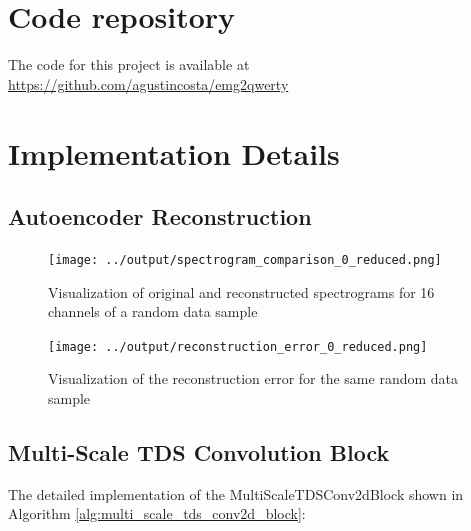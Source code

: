 \section{Code repository}
The code for this project is available at \url{https://github.com/agustincosta/emg2qwerty}

\section{Implementation Details}

\subsection{Autoencoder Reconstruction}
\begin{figure}[h]
    \centering
    \begin{minipage}{0.48\textwidth}
        \centering
        \texttt{[image: ../output/spectrogram\_comparison\_0\_reduced.png]}
        \caption{Visualization of original and reconstructed spectrograms for 16 channels of a random data sample}
        \label{fig:autoencoder_reconstruction}
    \end{minipage}
    \hfill
    \begin{minipage}{0.48\textwidth}
        \centering
        \texttt{[image: ../output/reconstruction\_error\_0\_reduced.png]}
        \caption{Visualization of the reconstruction error for the same random data sample}
        \label{fig:autoencoder_error}
    \end{minipage}
\end{figure}


\subsection{Multi-Scale TDS Convolution Block}

The detailed implementation of the MultiScaleTDSConv2dBlock shown in Algorithm \ref{alg:multi_scale_tds_conv2d_block}:

